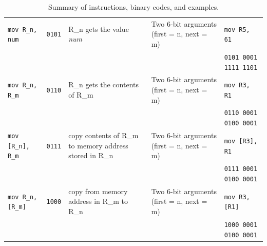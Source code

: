\documentclass{report}
\begin{document}
\begin{table}[h]
\begin{tabularx}{\textwidth}{@{}l l X X X@{}}
		\texttt{mov R\_n, num}
		                     & \texttt{0101}
		                     & R\_n gets the value \emph{num}
		                     & Two 6-bit arguments (first = n, next = m)
		                     & \texttt{mov R5, 61}                                                                                                                                   \\
		                     &
		                     &
		                     &
		                     & \texttt{0101 0001 1111 1101}
		\\

		\texttt{mov R\_n, R\_m}
		                     & \texttt{0110}
		                     & R\_n gets the contents of R\_m
		                     & Two 6-bit arguments (first = n, next = m)
		                     & \texttt{mov R3, R1}                                                                                                                                   \\
		                     &
		                     &
		                     &
		                     & \texttt{0110 0001 0100 0001}
		\\

		\texttt{mov [R\_n], R\_m}
		                     & \texttt{0111}
		                     & copy contents of R\_m to memory address stored in R\_n
		                     & Two 6-bit arguments (first = n, next = m)
		                     & \texttt{mov [R3], R1}                                                                                                                                 \\
		                     &
		                     &
		                     &
		                     & \texttt{0111 0001 0100 0001}
		\\

		\texttt{mov R\_n, [R\_m]}
		                     & \texttt{1000}
		                     & copy from memory address in R\_m to R\_n
		                     & Two 6-bit arguments (first = n, next = m)
		                     & \texttt{mov R3, [R1]}                                                                                                                                 \\
		                     &
		                     &
		                     &
		                     & \texttt{1000 0001 0100 0001}
		\\
		\bottomrule
	\end{tabularx}
	\caption{Summary of instructions, binary codes, and examples.}
	\label{tab:instructions}
\end{table}
\end{document}
